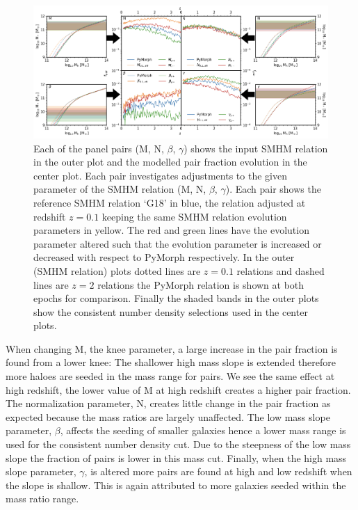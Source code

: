 \begin{landscape}
\begingroup
\begin{figure}[h]
	\centering
	\includegraphics[width = \linewidth]{Figures/Chapter5/PairFractionSystematic.png}
	\caption{Each of the panel pairs (M, N, $\beta$, $\gamma$) shows the input SMHM relation in the outer plot and the modelled pair fraction evolution in the center plot. Each pair investigates adjustments to the given parameter of the SMHM relation (M, N, $\beta$, $\gamma$). Each pair shows the reference SMHM relation `G18' in blue, the relation adjusted at redshift $z = 0.1$ keeping the same SMHM relation evolution parameters in yellow. The red and green lines have the evolution parameter altered such that the evolution parameter is increased or decreased with respect to PyMorph respectively. In the outer (SMHM relation) plots dotted lines are $z = 0.1$ relations and dashed lines are $z = 2$ relations the PyMorph relation is shown at both epochs for comparison. Finally the shaded bands in the outer plots show the consistent number density selections used in the center plots.}
	\label{fig:PairFracSystematic}
\end{figure}
\endgroup
\end{landscape}

When changing M, the knee parameter, a large increase in the pair fraction is found from a lower knee: The shallower high mass slope is extended therefore more haloes are seeded in the mass range for pairs. 
We see the same effect at high redshift, the lower value of M at high redshift creates a higher pair fraction. 
The normalization parameter, N, creates little change in the pair fraction as expected because the mass ratios are largely unaffected. 
The low mass slope parameter, $\beta$, affects the seeding of smaller galaxies hence a lower mass range is used for the consistent number density cut. 
Due to the steepness of the low mass slope the fraction of pairs is lower in this mass cut.
Finally, when the high mass slope parameter, $\gamma$, is altered more pairs are found at high and low redshift when the slope is shallow. 
This is again attributed to more galaxies seeded within the mass ratio range.

